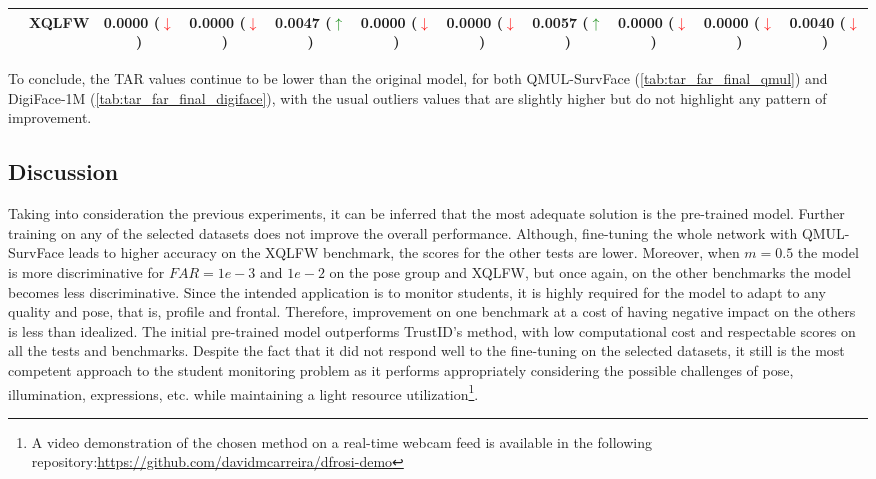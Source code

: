\documentclass[class=report, crop=false, a4paper, 12pt]{standalone}
\begin{document}
\begin{table}[H]
{\begin{tabular}{cl|ccc|ccc|ccc|}
    \multicolumn{1}{|c|}{}                         & XQLFW    & \multicolumn{1}{c|}{0.0000 (\textcolor{red}{$\downarrow$})} & \multicolumn{1}{c|}{0.0000 (\textcolor{red}{$\downarrow$})} & 0.0047 (\textcolor{green}{$\uparrow$})   & \multicolumn{1}{c|}{0.0000 (\textcolor{red}{$\downarrow$})} & \multicolumn{1}{c|}{0.0000 (\textcolor{red}{$\downarrow$})} & 0.0057 (\textcolor{green}{$\uparrow$})   & \multicolumn{1}{c|}{0.0000 (\textcolor{red}{$\downarrow$})} & \multicolumn{1}{c|}{0.0000 (\textcolor{red}{$\downarrow$})} & 0.0040 (\textcolor{red}{$\downarrow$}) \\ \hline
    \end{tabular}%
    }
\end{table}

\par To conclude, the TAR values continue to be lower than the original model, for both QMUL-SurvFace (\autoref{tab:tar_far_final_qmul}) and DigiFace-1M (\autoref{tab:tar_far_final_digiface}), with the usual outliers values that are slightly higher but do not highlight any pattern of improvement.

\subsection{Discussion}
\par Taking into consideration the previous experiments, it can be inferred that the most adequate solution is the pre-trained model. Further training on any of the selected datasets does not improve the overall performance. Although, fine-tuning the whole network with QMUL-SurvFace leads to higher accuracy on the XQLFW benchmark, the scores for the other tests are lower. Moreover, when $m=0.5$ the model is more discriminative for $FAR=1e-3$ and $1e-2$ on the pose group and XQLFW, but once again, on the other benchmarks the model becomes less discriminative. Since the intended application is to monitor students, it is highly required for the model to adapt to any quality and pose, that is, profile and frontal. Therefore, improvement on one benchmark at a cost of having negative impact on the others is less than idealized. The initial pre-trained model outperforms TrustID's method, with low computational cost and respectable scores on all the tests and benchmarks. Despite the fact that it did not respond well to the fine-tuning on the selected datasets, it still is the most competent approach to the student monitoring problem as it performs appropriately considering the possible challenges of pose, illumination, expressions, etc. while maintaining a light resource utilization\footnote{A video demonstration of the chosen method on a real-time webcam feed is available in the following repository:\url{https://github.com/davidmcarreira/dfrosi-demo}}. 

 
\end{document}

